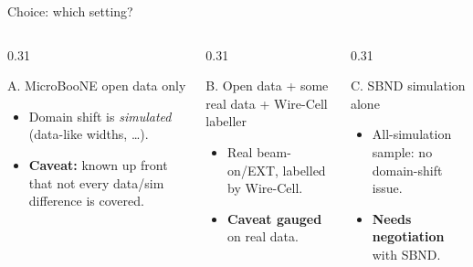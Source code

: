 \documentclass[aspectratio=169,10pt]{beamer}
\begin{document}
\begin{frame}{Choice: which setting?}
  \small
  \begin{columns}[T]
    \begin{column}{0.31\textwidth}
      \begin{block}{A. MicroBooNE open data only}
        \begin{itemize}
          \item Domain shift is \emph{simulated} (data-like widths, \dots).
          \item \textbf{Caveat:} known up front that not every data/sim difference is covered.
        \end{itemize}
      \end{block}
    \end{column}
    \begin{column}{0.31\textwidth}
      \begin{block}{B. Open data + some real data + Wire-Cell labeller}
        \begin{itemize}
          \item Real beam-on/EXT, labelled by Wire-Cell.
          \item \textbf{Caveat gauged} on real data.
        \end{itemize}
      \end{block}
    \end{column}
    \begin{column}{0.31\textwidth}
      \begin{block}{C. SBND simulation alone}
        \begin{itemize}
          \item All-simulation sample: no domain-shift issue.
          \item \textbf{Needs negotiation} with SBND.
        \end{itemize}
      \end{block}
    \end{column}
  \end{columns}
\end{frame}
\end{document}
